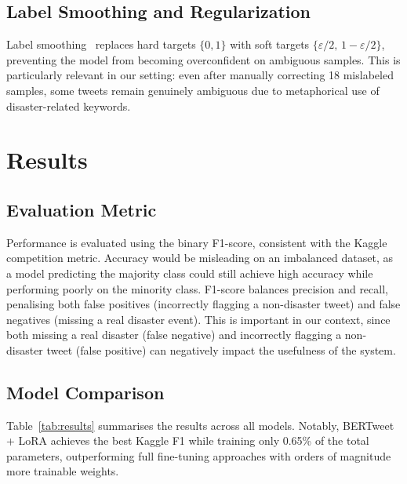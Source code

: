 \documentclass[conference]{IEEEtran}
\begin{document}
\subsection{Label Smoothing and Regularization}

Label smoothing~\cite{szegedy2016rethinking} replaces hard targets $\{0, 1\}$ with soft targets $\{\varepsilon/2,\, 1-\varepsilon/2\}$, preventing the model from becoming overconfident on ambiguous samples. This is particularly relevant in our setting: even after manually correcting 18 mislabeled samples, some tweets remain genuinely ambiguous due to metaphorical use of disaster-related keywords.

\section{Results}

\subsection{Evaluation Metric}
Performance is evaluated using the binary F1-score, consistent with the Kaggle competition metric. Accuracy would be misleading on an imbalanced dataset, as a model predicting the majority class could still achieve high accuracy while performing poorly on the minority class. F1-score balances precision and recall, penalising both false positives (incorrectly flagging a non-disaster tweet) and false negatives (missing a real disaster event). This is important in our context, since both missing a real disaster (false negative) and incorrectly flagging a non-disaster tweet (false positive) can negatively impact the usefulness of the system.

\subsection{Model Comparison}

Table~\ref{tab:results} summarises the results across all models. Notably, BERTweet + LoRA achieves the best Kaggle F1 while training only 0.65\% of the total parameters, outperforming full fine-tuning approaches with orders of magnitude more trainable weights.
\end{document}
